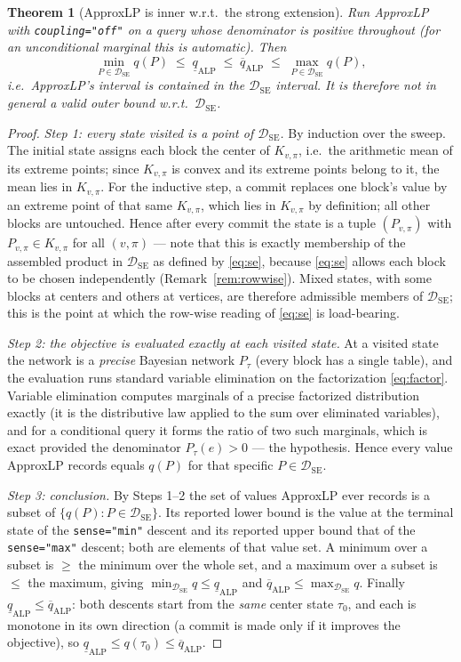 \documentclass[11pt]{article}
\newtheorem{theorem}{Theorem}
\theoremstyle{definition}
\newcommand{\lo}{\underline}
\newcommand{\hi}{\overline}
\newcommand{\DSE}{\mathcal{D}_{\mathrm{SE}}}
\begin{document}
\begin{theorem}[ApproxLP is inner w.r.t.\ the strong extension]\label{thm:alp}
Run ApproxLP with \texttt{coupling="off"} on a query whose denominator is positive throughout (for an
unconditional marginal this is automatic). Then
\[
  \min_{P\in\DSE}q(P)\;\le\;\lo q_{\mathrm{ALP}}\;\le\;\hi q_{\mathrm{ALP}}\;\le\;\max_{P\in\DSE}q(P),
\]
i.e.\ ApproxLP's interval is contained in the $\DSE$ interval. It is therefore not in general a valid
outer bound w.r.t.\ $\DSE$.
\end{theorem}

\begin{proof}
\emph{Step 1: every state visited is a point of $\DSE$.} By induction over the sweep. The initial
state assigns each block the center of $K_{v,\pi}$, i.e.\ the arithmetic mean of its extreme points;
since $K_{v,\pi}$ is convex and its extreme points belong to it, the mean lies in $K_{v,\pi}$. For the
inductive step, a commit replaces one block's value by an extreme point of that same $K_{v,\pi}$,
which lies in $K_{v,\pi}$ by definition; all other blocks are untouched. Hence after every commit the
state is a tuple $(P_{v,\pi})$ with $P_{v,\pi}\in K_{v,\pi}$ for all $(v,\pi)$ --- note that this is
exactly membership of the assembled product in $\DSE$ as defined by \eqref{eq:se}, because
\eqref{eq:se} allows each block to be chosen independently (Remark~\ref{rem:rowwise}). Mixed states,
with some blocks at centers and others at vertices, are therefore admissible members of $\DSE$; this
is the point at which the row-wise reading of \eqref{eq:se} is load-bearing.

\emph{Step 2: the objective is evaluated exactly at each visited state.} At a visited state the
network is a \emph{precise} Bayesian network $P_\tau$ (every block has a single table), and the
evaluation runs standard variable elimination on the factorization \eqref{eq:factor}. Variable
elimination computes marginals of a precise factorized distribution exactly (it is the distributive
law applied to the sum over eliminated variables), and for a conditional query it forms the ratio of
two such marginals, which is exact provided the denominator $P_\tau(e)>0$ --- the hypothesis. Hence
every value ApproxLP records equals $q(P)$ for that specific $P\in\DSE$.

\emph{Step 3: conclusion.} By Steps 1--2 the set of values ApproxLP ever records is a subset of
$\{q(P):P\in\DSE\}$. Its reported lower bound is the value at the terminal state of the
\texttt{sense="min"} descent and its reported upper bound that of the \texttt{sense="max"} descent;
both are elements of that value set. A minimum over a subset is $\ge$ the minimum over the whole set,
and a maximum over a subset is $\le$ the maximum, giving
$\min_{\DSE}q\le\lo q_{\mathrm{ALP}}$ and $\hi q_{\mathrm{ALP}}\le\max_{\DSE}q$. Finally
$\lo q_{\mathrm{ALP}}\le\hi q_{\mathrm{ALP}}$: both descents start from the \emph{same} center state
$\tau_0$, and each is monotone in its own direction (a commit is made only if it improves the
objective), so $\lo q_{\mathrm{ALP}}\le q(\tau_0)\le\hi q_{\mathrm{ALP}}$.
\end{proof}
\end{document}
